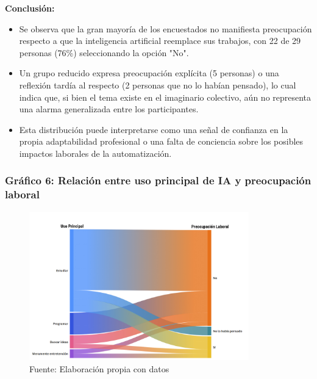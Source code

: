 \documentclass[12pt, a4paper]{article}
\begin{document}
\textbf{Conclusión:}  
\begin{itemize}
    \item Se observa que la gran mayoría de los encuestados no manifiesta preocupación respecto a que la inteligencia artificial reemplace sus trabajos, con 22 de 29 personas (76\%) seleccionando la opción "No".
    \item Un grupo reducido expresa preocupación explícita (5 personas) o una reflexión tardía al respecto (2 personas que no lo habían pensado), lo cual indica que, si bien el tema existe en el imaginario colectivo, aún no representa una alarma generalizada entre los participantes.
    \item Esta distribución puede interpretarse como una señal de confianza en la propia adaptabilidad profesional o una falta de conciencia sobre los posibles impactos laborales de la automatización.
\end{itemize}

\subsubsection*{Gráfico 6: Relación entre uso principal de IA y preocupación laboral}
\begin{figure}[H]
    \centering
    \includegraphics[width=0.85\textwidth]{Graficos/UsoPrincipalVSPreocupacionLaboral.jpg}
    \caption[6]{Fuente: Elaboración propia con datos}

\end{figure}
\end{document}
